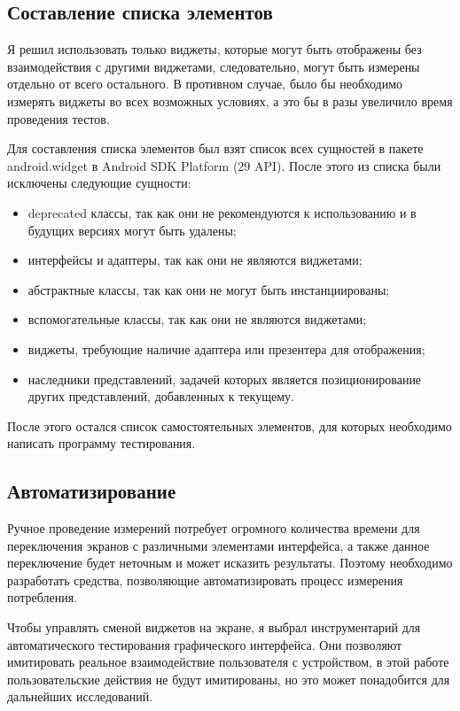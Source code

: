 \documentclass[a4paper,14pt]{extarticle} %
\begin{document}
	\subsection{Составление списка элементов}
	
	Я решил использовать только виджеты, которые могут быть отображены без взаимодействия с другими виджетами, следовательно, могут быть измерены отдельно от всего остального. В противном случае, было бы необходимо измерять виджеты во всех возможных условиях, а это бы в разы увеличило время проведения тестов.
	
	Для составления списка элементов был взят список всех сущностей в пакете android.widget в Android SDK Platform (29 API). После этого из списка были исключены следующие сущности:
	\begin{itemize}
		\item deprecated классы, так как они не рекомендуются к использованию и в будущих версиях могут быть удалены;
		\item интерфейсы и адаптеры, так как они не являются виджетами;
		\item абстрактные классы, так как они не могут быть инстанциированы;
		\item вспомогательные классы, так как они не являются виджетами;
		\item виджеты, требующие наличие адаптера или презентера для отображения;
		\item наследники представлений, задачей которых является позиционирование других представлений, добавленных к текущему.
	\end{itemize}
	
	После этого остался список самостоятельных элементов, для которых необходимо написать программу тестирования.
	
	\subsection{Автоматизирование}
	
	Ручное проведение измерений потребует огромного количества времени для переключения экранов с различными элементами интерфейса, а также данное переключение будет неточным и может исказить результаты. Поэтому необходимо разработать средства, позволяющие автоматизировать процесс измерения потребления.
	
	Чтобы управлять сменой виджетов на экране, я выбрал инструментарий для автоматического тестирования графического интерфейса. Они позволяют имитировать реальное взаимодействие пользователя с устройством, в этой работе пользовательские действия не будут имитированы, но это может понадобится для дальнейших исследований.
	
\end{document}
